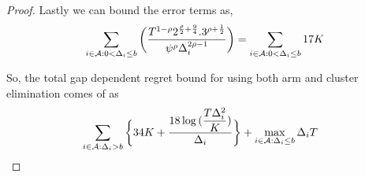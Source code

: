 \begin{proof}
	Lastly we can bound the error terms as, 
	\begin{align*}
	\sum\limits_{i\in \mathcal{A} :0 < \Delta_{i}\leq b}\bigg(\dfrac{T^{1-\rho}2^{\frac{\rho}{2}+\frac{9}{4}}.3^{\rho +\frac{1}{2}}}{\psi^{\rho }\Delta_{i}^{2\rho -1}} \bigg)= \sum\limits_{i\in \mathcal{A} :0 < \Delta_{i}\leq b} 17 K
	\end{align*}

	So, the total gap dependent regret bound for using both arm and cluster elimination comes of as
	\begin{align*}
	& \sum_{i\in \mathcal{A} :\Delta_{i} > b}\bigg\lbrace 34 K + \dfrac{18\log{(\dfrac{T\Delta_{i}^{2}}{ K})}}{\Delta_{i}}\bigg\rbrace 
 + \max\limits_{i\in \mathcal{A} :\Delta_{i}\leq b}\Delta_{i}T 
	\end{align*}
\end{proof}




